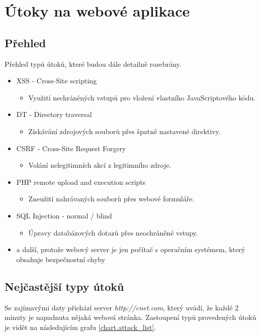\chapter{Útoky na webové aplikace}
\section{Přehled}
Přehled typů útoků, které budou dále detailně rozebrány.
\begin{itemize}
\item XSS - Cross-Site scripting
\begin{itemize}
\item Využití nechráněných vstupů pro vložení vlastního JavaScriptového kódu.
\end{itemize}
\item DT - Directory traversal
\begin{itemize}
\item Získávání zdrojových souborů přes špatně nastavené direktivy.
\end{itemize}
\item CSRF - Cross-Site Request Forgery 
\begin{itemize}
\item Volání nelegitimních akcí z legitimního zdroje.
\end{itemize}
\item PHP remote upload and execution scripts
\begin{itemize}
\item Zneužití nahrávaných souborů přes webové formuláře.
\end{itemize}
\item SQL Injection - normal / blind
\begin{itemize}
\item Úpravy databázových dotazů přes neochráněné vstupy.
\end{itemize}
\item a další, protože webový server je jen počítač s operačním systémem, který obsahuje bezpečnostní chyby
\end{itemize}

\section{Nejčastější typy útoků}
Se zajímavými daty přichází server \textit{http://cnet.com}, který uvádí, že každé 2 minuty je napadnuta nějaká webová stránka. Zastoupení typů provedených útoků je vidět na následujícím grafu \ref{chart.attack_list}.

